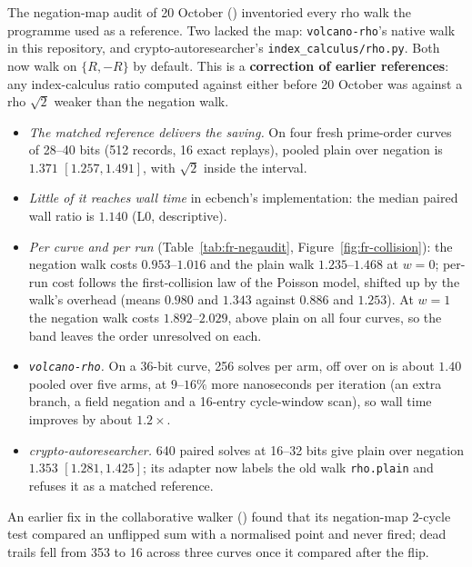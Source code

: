 The negation-map audit of 20 October
() inventoried every rho walk the
programme used as a reference. Two lacked the map: \texttt{volcano-rho}'s
native walk in this repository, and crypto-autoresearcher's
\texttt{index\_calculus/rho.py}. Both now walk on $\{R,-R\}$ by default.
This is a \textbf{correction of earlier references}: any index-calculus
ratio computed against either before 20 October was against a rho $\sqrt2$
weaker than the negation walk.
\begin{itemize}
\item \emph{The matched reference delivers the saving.} On four fresh
  prime-order curves of 28--40 bits (512 records, 16 exact replays),
  pooled plain over negation is $1.371$ $[1.257,1.491]$, with $\sqrt2$
  inside the interval.
\item \emph{Little of it reaches wall time} in ecbench's implementation:
  the median paired wall ratio is $1.140$ (L0, descriptive).
\item \emph{Per curve and per run} (Table~\ref{tab:fr-negaudit},
  Figure~\ref{fig:fr-collision}): the negation walk costs $0.953$--$1.016$
  and the plain walk $1.235$--$1.468$ at $w=0$; per-run cost follows the
  first-collision law of the Poisson model, shifted up by the walk's
  overhead (means $0.980$ and $1.343$ against $0.886$ and $1.253$). At
  $w=1$ the negation walk costs $1.892$--$2.029$, above plain on all four
  curves, so the band leaves the order unresolved on each.
\item \emph{\texttt{volcano-rho}.} On a 36-bit curve, 256 solves per arm,
  off over on is about $1.40$ pooled over five arms, at $9$--$16\%$ more
  nanoseconds per iteration (an extra branch, a field negation and a
  16-entry cycle-window scan), so wall time improves by about $1.2\times$.
\item \emph{crypto-autoresearcher.} 640 paired solves at 16--32 bits give
  plain over negation $1.353$ $[1.281,1.425]$; its adapter now labels the
  old walk \texttt{rho.plain} and refuses it as a matched reference.
\end{itemize}
An earlier fix in the collaborative walker
() found that its
negation-map 2-cycle test compared an unflipped sum with a normalised
point and never fired; dead trails fell from 353 to 16 across three
curves once it compared after the flip.

